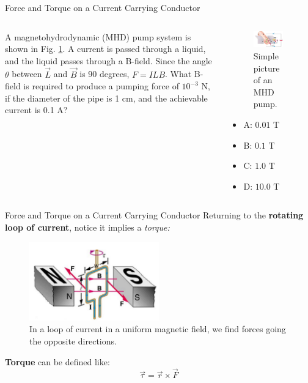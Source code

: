 \documentclass{beamer}
\begin{document}
\begin{frame}{Force and Torque on a Current Carrying Conductor}
\begin{columns}[T]
\begin{column}{0.4\textwidth}
\footnotesize
A magnetohydrodynamic (MHD) pump system is shown in Fig. \ref{fig:MHD}.  A current is passed through a liquid, and the liquid passes through a B-field.  Since the angle $\theta$ between $\vec{L}$ and $\vec{B}$ is 90 degrees, $\boxed{F = ILB}$.  What B-field is required to produce a pumping force of $10^{-3}$ N, if the diameter of the pipe is 1 cm, and the achievable current is 0.1 A?
\end{column}
\begin{column}{0.6\textwidth}
\begin{figure}
\centering
\includegraphics[width=0.85\textwidth]{figures/MHD.png}
\caption{\label{fig:MHD} \footnotesize Simple picture of an MHD pump.}
\end{figure}
\normalsize
\begin{itemize}
\item A: $0.01$ T
\item B: $0.1$ T
\item C: $1.0$ T
\item D: $10.0$ T
\end{itemize}
\end{column}
\end{columns}
\end{frame}

\begin{frame}{Force and Torque on a Current Carrying Conductor}
\small
Returning to the \textbf{rotating loop of current}, notice it implies a \textit{torque:}
\begin{figure}
\centering
\includegraphics[width=0.5\textwidth]{figures/loop.png}
\caption{\label{fig:loop} In a loop of current in a uniform magnetic field, we find forces going the opposite directions.}
\end{figure}
\textbf{\alert{Torque}} can be defined like:
\begin{equation}
\boxed{\vec{\tau} = \vec{r} \times \vec{F}}
\end{equation}
\end{frame}
\end{document}
